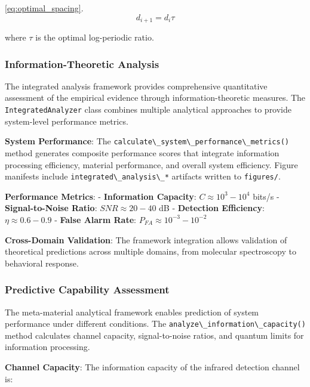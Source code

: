 \documentclass[
  13pt,
  a4paperpaper,
  12pt]{article}
\newcommand{\passthrough}[1]{#1}
\begin{document}
\eqref{eq:optimal_spacing}. \begin{equation}
d_{i+1} = d_i \tau \label{eq:optimal_spacing}
\end{equation}

where \(\tau\) is the optimal log-periodic ratio.

\subsubsection{Information-Theoretic
Analysis}\label{information-theoretic-analysis}

The integrated analysis framework provides comprehensive quantitative
assessment of the empirical evidence through information-theoretic
measures. The \passthrough{\lstinline!IntegratedAnalyzer!} class
combines multiple analytical approaches to provide system-level
performance metrics.

\textbf{System Performance}: The
\passthrough{\lstinline!calculate\_system\_performance\_metrics()!}
method generates composite performance scores that integrate information
processing efficiency, material performance, and overall system
efficiency. Figure manifests include
\passthrough{\lstinline!integrated\_analysis\_*!} artifacts written to
\passthrough{\lstinline!figures/!}.

\textbf{Performance Metrics}: - \textbf{Information Capacity}:
\(C \approx 10^3-10^4\) bits/s - \textbf{Signal-to-Noise Ratio}:
\(SNR \approx 20-40\) dB - \textbf{Detection Efficiency}:
\(\eta \approx 0.6-0.9\) - \textbf{False Alarm Rate}:
\(P_{FA} \approx 10^{-3}-10^{-2}\)

\textbf{Cross-Domain Validation}: The framework integration allows
validation of theoretical predictions across multiple domains, from
molecular spectroscopy to behavioral response.

\subsubsection{Predictive Capability
Assessment}\label{predictive-capability-assessment}

The meta-material analytical framework enables prediction of system
performance under different conditions. The
\passthrough{\lstinline!analyze\_information\_capacity()!} method
calculates channel capacity, signal-to-noise ratios, and quantum limits
for information processing.

\textbf{Channel Capacity}: The information capacity of the infrared
detection channel is:
\end{document}
